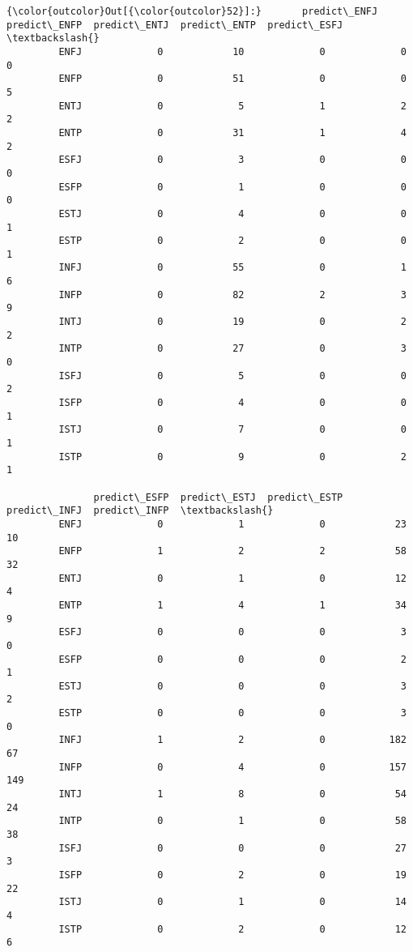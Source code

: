 \documentclass[11pt]{article}
\begin{document}
\begin{Verbatim}[commandchars=\\\{\}]
{\color{outcolor}Out[{\color{outcolor}52}]:}       predict\_ENFJ  predict\_ENFP  predict\_ENTJ  predict\_ENTP  predict\_ESFJ  \textbackslash{}
         ENFJ             0            10             0             0             0   
         ENFP             0            51             0             0             5   
         ENTJ             0             5             1             2             2   
         ENTP             0            31             1             4             2   
         ESFJ             0             3             0             0             0   
         ESFP             0             1             0             0             0   
         ESTJ             0             4             0             0             1   
         ESTP             0             2             0             0             1   
         INFJ             0            55             0             1             6   
         INFP             0            82             2             3             9   
         INTJ             0            19             0             2             2   
         INTP             0            27             0             3             0   
         ISFJ             0             5             0             0             2   
         ISFP             0             4             0             0             1   
         ISTJ             0             7             0             0             1   
         ISTP             0             9             0             2             1   
         
               predict\_ESFP  predict\_ESTJ  predict\_ESTP  predict\_INFJ  predict\_INFP  \textbackslash{}
         ENFJ             0             1             0            23            10   
         ENFP             1             2             2            58            32   
         ENTJ             0             1             0            12             4   
         ENTP             1             4             1            34             9   
         ESFJ             0             0             0             3             0   
         ESFP             0             0             0             2             1   
         ESTJ             0             0             0             3             2   
         ESTP             0             0             0             3             0   
         INFJ             1             2             0           182            67   
         INFP             0             4             0           157           149   
         INTJ             1             8             0            54            24   
         INTP             0             1             0            58            38   
         ISFJ             0             0             0            27             3   
         ISFP             0             2             0            19            22   
         ISTJ             0             1             0            14             4   
         ISTP             0             2             0            12             6   
         

\end{Verbatim}
\end{document}
